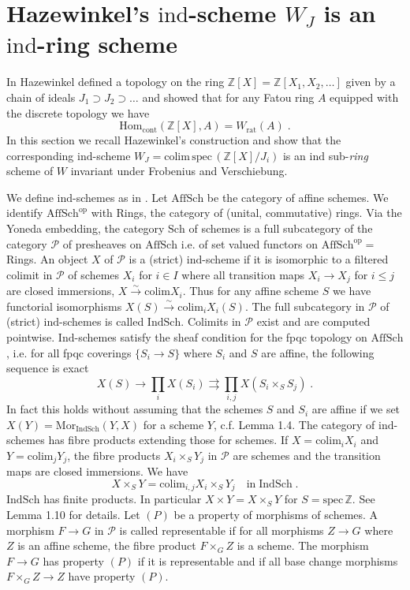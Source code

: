 \documentclass[12pt,leqno]{article}
\newcommand{\Z}{{\mathbb{Z}}}
\newcommand{\cont}{\mathrm{cont}}
\newcommand{\Mor}{\mathrm{Mor}}
\newcommand{\op}{\mathrm{op}}
\newcommand{\spec}{\mathrm{spec}\,}
\newcommand{\Hom}{\mathrm{Hom}}
\newcommand{\ind}{\mathrm{ind}}
\newcommand{\rat}{\mathrm{rat}}
\newcommand{\Ph}{\mathcal{P}}
\newcommand{\silo}{\stackrel{\sim}{\rightarrow}}
\newcommand{\colim}{\mathrm{colim}}
\newcommand{\Affsch}{\mathrm{AffSch}}
\newcommand{\Indsch}{\mathrm{IndSch}}
\newcommand{\Sch}{\mathrm{Sch}}
\newcommand{\Ind}{\mathrm{Ind}}
\begin{document}
\section{Hazewinkel's $\ind$-scheme $W_J$ is an $\ind$-ring scheme} \label{sec:2}

In \cite{H} Hazewinkel defined a topology on the ring $\Z [X] = \Z [X_1 , X_2 , \ldots ]$ given by a chain of ideals $J_1 \supset J_2 \supset \ldots$ and showed that for any Fatou ring $A$ equipped with the discrete topology we have
\[
\Hom_{\cont} (\Z [X] , A) = W_{\rat} (A) \; .
\]
In this section we recall Hazewinkel's construction and show that the corresponding $\ind$-scheme $W_J = \colim \, \spec (\Z [X] / J_i)$ is an $\ind$ sub-{\it ring} scheme of $W$ invariant under Frobenius and Verschiebung.

We define $\ind$-schemes as in \cite{R}. Let $\Affsch$ be the category of affine schemes. We identify $\Affsch^{\op}$ with Rings, the category of (unital, commutative) rings. Via the Yoneda embedding, the category $\Sch$ of schemes is a full subcategory of the category $\Ph$ of presheaves on $\Affsch$ i.e. of set valued functors on $\Affsch^{\op} =$ Rings. An object $X$ of $\Ph$ is a (strict) $\ind$-scheme if it is isomorphic to a filtered colimit in $\Ph$ of schemes $X_i$ for $i \in I$ where all transition maps $X_i \to X_j$ for $i \le j$ are closed immersions, $X \silo \colim X_i$. Thus for any affine scheme $S$ we have functorial isomorphisms $X (S) \silo \colim_i X_i (S)$. The full subcategory in $\Ph$ of (strict) $\ind$-schemes is called $\Indsch$. Colimits in $\Ph$ exist and are computed pointwise. $\Ind$-schemes satisfy the sheaf condition for the fpqc topology on $\Affsch$, i.e. for all fpqc coverings $\{ S_i \to S \}$ where $S_i$ and $S$ are affine, the following sequence is exact
\begin{equation}
\label{eq:8}
X (S) \longrightarrow \prod_i X (S_i) \rightrightarrows \prod_{i,j} X (S_i \times_S S_j) \; .
\end{equation}
In fact this holds without assuming that the schemes $S$ and $S_i$ are affine if we set $X (Y) = \Mor_{\Indsch} (Y,X)$ for a scheme $Y$, c.f. \cite{R} Lemma 1.4. The category of $\ind$-schemes has fibre products extending those for schemes. If $X = \colim_i X_i$ and $Y = \colim_j Y_j$, the fibre products $X_i \times_S Y_j$ in $\Ph$ are schemes and the transition maps are closed immersions. We have
\begin{equation}
\label{eq:9}
X \times_S Y = \colim_{i,j} X_i \times_S Y_j \quad \text{in} \; \Indsch \; .
\end{equation}
$\Indsch$ has finite products. In particular $X \times Y = X \times_S Y$ for $S = \spec \Z$. 
See \cite{R} Lemma 1.10 for details. Let $(P)$ be a property of morphisms of schemes. A morphism $F \to G$ in $\Ph$ is called representable if for all morphisms $Z \to G$ where $Z$ is an affine scheme, the fibre product $F \times_G Z$ is a scheme. The morphism $F \to G$ has property $(P)$ if it is representable and if all base change morphisms $F \times_G Z \to Z$ have property $(P)$. 
\end{document}
